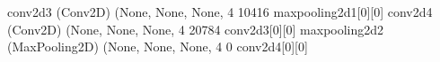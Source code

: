 \documentclass[letterpaper,10pt,english]{sphinxmanual}
\begin{document}
\begin{sphinxVerbatim}[commandchars=\\\{\}]
conv2d\PYGZus{}3 (Conv2D)               (None, None, None, 4 10416       max\PYGZus{}pooling2d\PYGZus{}1[0][0]            
\PYGZus{}\PYGZus{}\PYGZus{}\PYGZus{}\PYGZus{}\PYGZus{}\PYGZus{}\PYGZus{}\PYGZus{}\PYGZus{}\PYGZus{}\PYGZus{}\PYGZus{}\PYGZus{}\PYGZus{}\PYGZus{}\PYGZus{}\PYGZus{}\PYGZus{}\PYGZus{}\PYGZus{}\PYGZus{}\PYGZus{}\PYGZus{}\PYGZus{}\PYGZus{}\PYGZus{}\PYGZus{}\PYGZus{}\PYGZus{}\PYGZus{}\PYGZus{}\PYGZus{}\PYGZus{}\PYGZus{}\PYGZus{}\PYGZus{}\PYGZus{}\PYGZus{}\PYGZus{}\PYGZus{}\PYGZus{}\PYGZus{}\PYGZus{}\PYGZus{}\PYGZus{}\PYGZus{}\PYGZus{}\PYGZus{}\PYGZus{}\PYGZus{}\PYGZus{}\PYGZus{}\PYGZus{}\PYGZus{}\PYGZus{}\PYGZus{}\PYGZus{}\PYGZus{}\PYGZus{}\PYGZus{}\PYGZus{}\PYGZus{}\PYGZus{}\PYGZus{}\PYGZus{}\PYGZus{}\PYGZus{}\PYGZus{}\PYGZus{}\PYGZus{}\PYGZus{}\PYGZus{}\PYGZus{}\PYGZus{}\PYGZus{}\PYGZus{}\PYGZus{}\PYGZus{}\PYGZus{}\PYGZus{}\PYGZus{}\PYGZus{}\PYGZus{}\PYGZus{}\PYGZus{}\PYGZus{}\PYGZus{}\PYGZus{}\PYGZus{}\PYGZus{}\PYGZus{}\PYGZus{}\PYGZus{}\PYGZus{}\PYGZus{}\PYGZus{}\PYGZus{}
conv2d\PYGZus{}4 (Conv2D)               (None, None, None, 4 20784       conv2d\PYGZus{}3[0][0]                   
\PYGZus{}\PYGZus{}\PYGZus{}\PYGZus{}\PYGZus{}\PYGZus{}\PYGZus{}\PYGZus{}\PYGZus{}\PYGZus{}\PYGZus{}\PYGZus{}\PYGZus{}\PYGZus{}\PYGZus{}\PYGZus{}\PYGZus{}\PYGZus{}\PYGZus{}\PYGZus{}\PYGZus{}\PYGZus{}\PYGZus{}\PYGZus{}\PYGZus{}\PYGZus{}\PYGZus{}\PYGZus{}\PYGZus{}\PYGZus{}\PYGZus{}\PYGZus{}\PYGZus{}\PYGZus{}\PYGZus{}\PYGZus{}\PYGZus{}\PYGZus{}\PYGZus{}\PYGZus{}\PYGZus{}\PYGZus{}\PYGZus{}\PYGZus{}\PYGZus{}\PYGZus{}\PYGZus{}\PYGZus{}\PYGZus{}\PYGZus{}\PYGZus{}\PYGZus{}\PYGZus{}\PYGZus{}\PYGZus{}\PYGZus{}\PYGZus{}\PYGZus{}\PYGZus{}\PYGZus{}\PYGZus{}\PYGZus{}\PYGZus{}\PYGZus{}\PYGZus{}\PYGZus{}\PYGZus{}\PYGZus{}\PYGZus{}\PYGZus{}\PYGZus{}\PYGZus{}\PYGZus{}\PYGZus{}\PYGZus{}\PYGZus{}\PYGZus{}\PYGZus{}\PYGZus{}\PYGZus{}\PYGZus{}\PYGZus{}\PYGZus{}\PYGZus{}\PYGZus{}\PYGZus{}\PYGZus{}\PYGZus{}\PYGZus{}\PYGZus{}\PYGZus{}\PYGZus{}\PYGZus{}\PYGZus{}\PYGZus{}\PYGZus{}\PYGZus{}\PYGZus{}
max\PYGZus{}pooling2d\PYGZus{}2 (MaxPooling2D)  (None, None, None, 4 0           conv2d\PYGZus{}4[0][0]                   
\PYGZus{}\PYGZus{}\PYGZus{}\PYGZus{}\PYGZus{}\PYGZus{}\PYGZus{}\PYGZus{}\PYGZus{}\PYGZus{}\PYGZus{}\PYGZus{}\PYGZus{}\PYGZus{}\PYGZus{}\PYGZus{}\PYGZus{}\PYGZus{}\PYGZus{}\PYGZus{}\PYGZus{}\PYGZus{}\PYGZus{}\PYGZus{}\PYGZus{}\PYGZus{}\PYGZus{}\PYGZus{}\PYGZus{}\PYGZus{}\PYGZus{}\PYGZus{}\PYGZus{}\PYGZus{}\PYGZus{}\PYGZus{}\PYGZus{}\PYGZus{}\PYGZus{}\PYGZus{}\PYGZus{}\PYGZus{}\PYGZus{}\PYGZus{}\PYGZus{}\PYGZus{}\PYGZus{}\PYGZus{}\PYGZus{}\PYGZus{}\PYGZus{}\PYGZus{}\PYGZus{}\PYGZus{}\PYGZus{}\PYGZus{}\PYGZus{}\PYGZus{}\PYGZus{}\PYGZus{}\PYGZus{}\PYGZus{}\PYGZus{}\PYGZus{}\PYGZus{}\PYGZus{}\PYGZus{}\PYGZus{}\PYGZus{}\PYGZus{}\PYGZus{}\PYGZus{}\PYGZus{}\PYGZus{}\PYGZus{}\PYGZus{}\PYGZus{}\PYGZus{}\PYGZus{}\PYGZus{}\PYGZus{}\PYGZus{}\PYGZus{}\PYGZus{}\PYGZus{}\PYGZus{}\PYGZus{}\PYGZus{}\PYGZus{}\PYGZus{}\PYGZus{}\PYGZus{}\PYGZus{}\PYGZus{}\PYGZus{}\PYGZus{}\PYGZus{}\PYGZus{}

\end{sphinxVerbatim}
\end{document}
